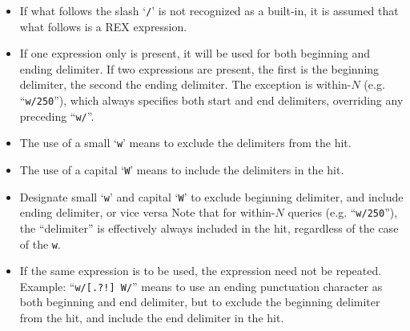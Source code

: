 \begin{itemize}
\item If what follows the slash `\verb`/`' is not recognized as a
built-in, it is assumed that what follows is a REX expression.

\item If one expression only is present, it will be used for both
beginning and ending delimiter.  If two expressions are present, the
first is the beginning delimiter, the second the ending delimiter.
The exception is within-$N$ (e.g. ``\verb`w/250`''), which always
specifies both start and end delimiters, overriding any preceding
``\verb`w/`''.

\item The use of a small `\verb`w`' means to exclude the delimiters
from the hit.

\item The use of a capital `\verb`W`' means to include the delimiters
in the hit.

\item Designate small `\verb`w`' and capital `\verb`W`' to exclude
beginning delimiter, and include ending delimiter, or vice versa
Note that for within-$N$ queries (e.g. ``\verb`w/250`''), the
``delimiter'' is effectively always included in the hit, regardless
of the case of the \verb`w`.

\item If the same expression is to be used, the expression need not be
repeated.  Example:  ``\verb`w/[.?!] W/`'' means to use an ending
punctuation character as both beginning and end delimiter, but to
exclude the beginning delimiter from the hit, and include the end
delimiter in the hit.
\end{itemize}
